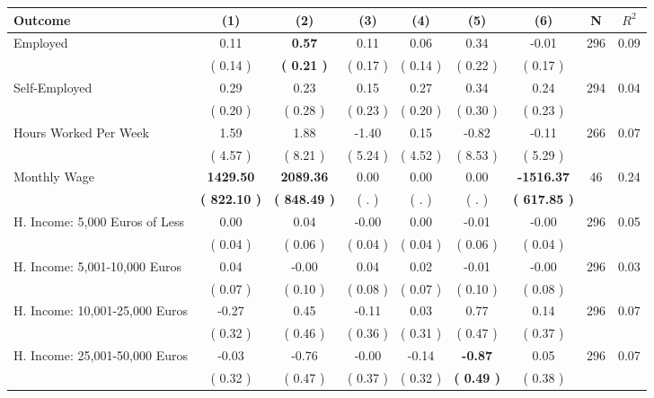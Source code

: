 \begin{tabular}{lcccccccc}
\toprule
 \textbf{Outcome} & \textbf{(1)} & \textbf{(2)} & \textbf{(3)} & \textbf{(4)} & \textbf{(5)} & \textbf{(6)} & \textbf{N} & \textbf{$ R^2$} \\
\midrule
Employed &      0.11 & \textbf{     0.57} &      0.11 &      0.06 &      0.34 &     -0.01 & 296 &       0.09 \\ 
 & (     0.14 ) & \textbf{(     0.21 )} & (     0.17 ) & (     0.14 ) & (     0.22 ) & (     0.17 ) & \\
Self-Employed &      0.29 &      0.23 &      0.15 &      0.27 &      0.34 &      0.24 & 294 &       0.04 \\ 
 & (     0.20 ) & (     0.28 ) & (     0.23 ) & (     0.20 ) & (     0.30 ) & (     0.23 ) & \\
Hours Worked Per Week &      1.59 &      1.88 &     -1.40 &      0.15 &     -0.82 &     -0.11 & 266 &       0.07 \\ 
 & (     4.57 ) & (     8.21 ) & (     5.24 ) & (     4.52 ) & (     8.53 ) & (     5.29 ) & \\
Monthly Wage & \textbf{  1429.50} & \textbf{  2089.36} &      0.00 &      0.00 &      0.00 & \textbf{ -1516.37} & 46 &       0.24 \\ 
 & \textbf{(   822.10 )} & \textbf{(   848.49 )} & (        . ) & (        . ) & (        . ) & \textbf{(   617.85 )} & \\
H. Income: 5,000 Euros of Less &      0.00 &      0.04 &     -0.00 &      0.00 &     -0.01 &     -0.00 & 296 &       0.05 \\ 
 & (     0.04 ) & (     0.06 ) & (     0.04 ) & (     0.04 ) & (     0.06 ) & (     0.04 ) & \\
H. Income: 5,001-10,000 Euros &      0.04 &     -0.00 &      0.04 &      0.02 &     -0.01 &     -0.00 & 296 &       0.03 \\ 
 & (     0.07 ) & (     0.10 ) & (     0.08 ) & (     0.07 ) & (     0.10 ) & (     0.08 ) & \\
H. Income: 10,001-25,000 Euros &     -0.27 &      0.45 &     -0.11 &      0.03 &      0.77 &      0.14 & 296 &       0.07 \\ 
 & (     0.32 ) & (     0.46 ) & (     0.36 ) & (     0.31 ) & (     0.47 ) & (     0.37 ) & \\
H. Income: 25,001-50,000 Euros &     -0.03 &     -0.76 &     -0.00 &     -0.14 & \textbf{    -0.87} &      0.05 & 296 &       0.07 \\ 
 & (     0.32 ) & (     0.47 ) & (     0.37 ) & (     0.32 ) & \textbf{(     0.49 )} & (     0.38 ) & \\

\end{tabular}
